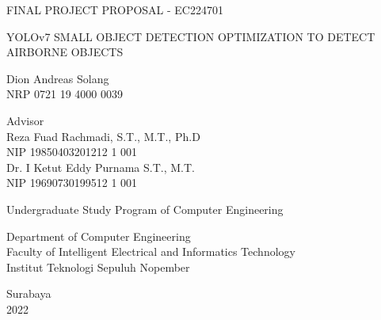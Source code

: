 \begin{large}
  FINAL PROJECT PROPOSAL - EC224701
\end{large}

\vspace{\fill}

\begin{spacing}{1.5}
  \begin{Large}
    YOLOv7 SMALL OBJECT DETECTION OPTIMIZATION 
    TO DETECT AIRBORNE OBJECTS
  \end{Large}
\end{spacing}

\vspace{\fill}

\begin{large}
  Dion Andreas Solang \\
  \textmd{NRP 0721 19 4000 0039}
\end{large}

\vspace{\fill}

\begin{large}
  \textmd{Advisor} \\
  Reza Fuad Rachmadi, S.T., M.T., Ph.D \\
  \textmd{NIP 19850403201212 1 001} \\
  Dr. I Ketut Eddy Purnama S.T., M.T. \\
  \textmd{NIP 19690730199512 1 001}
\end{large}

\vspace{\fill}

Undergraduate Study Program of Computer Engineering \\

\mdseries

Department of Computer Engineering \\
Faculty of Intelligent Electrical and Informatics Technology\\
Institut Teknologi Sepuluh Nopember

Surabaya \\
2022

